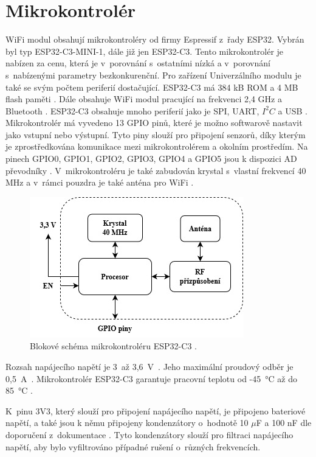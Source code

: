 \section{Mikrokontrolér}
WiFi modul obsahují mikrokontroléry od firmy Espressif z~řady ESP32. Vybrán byl typ ESP32-C3-MINI-1, dále již jen ESP32-C3. Tento mikrokontrolér je nabízen za cenu, která 
je v~porovnání s~ostatními nízká a v~porovnání s~nabízenými parametry bezkonkurenční. Pro zařízení Univerzálního modulu je také se svým počtem periferií dostačující. ESP32-C3 má 
384 kB ROM a 4 MB flash paměti \cite{ESP_C3_dtsh}. Dále obsahuje WiFi modul pracující na frekvenci 2,4 GHz a Bluetooth \cite{ESP_C3_dtsh}. ESP32-C3 obsahuje mnoho periferií
jako je SPI, UART, $I^2C$ a USB \cite{ESP_C3_dtsh}. Mikrokontrolér má vyvedeno 13 GPIO pinů, které je možno softwarově nastavit jako vstupní nebo výstupní. Tyto piny
slouží pro připojení senzorů, díky kterým je zprostředkována komunikace mezi mikrokontrolérem a okolním prostředím. Na pinech GPIO0, GPIO1, GPIO2, GPIO3, GPIO4 a GPIO5 jsou 
k dispozici AD převodníky \cite{ESP_C3_tech_ref}. V~mikrokontroléru je také zabudován krystal s~vlastní frekvencí 
40 MHz a v~rámci pouzdra je také anténa pro WiFi \cite{ESP_C3_dtsh}.

\begin{figure}[!h]
  \begin{center}
    \includegraphics[scale=0.8]{obrazky/blokove_schema_MCU.jpg}
  \end{center}
  \caption[Blokové schéma mikrokontroléru ESP32-C3]{Blokové schéma mikrokontroléru ESP32-C3 \cite{ESP_C3_dtsh}.}
\end{figure}

Rozsah napájecího napětí je 3~až 3,6~V~\cite{ESP_C3_dtsh}. Jeho maximální proudový odběr je 0,5~A~\cite{ESP_C3_dtsh}. Mikrokontrolér ESP32-C3 garantuje pracovní teplotu 
od -45~°C až do 85~°C \cite{ESP_C3_dtsh}.

K~pinu 3V3, který slouží pro připojení napájecího napětí, je připojeno bateriové napětí, a také jsou k němu připojeny kondenzátory o~hodnotě 10 $\mu$F a 100 nF dle doporučení z~dokumentace \cite{ESP_C3_dtsh}. Tyto 
kondenzátory slouží pro filtraci napájecího napětí, aby bylo vyfiltrováno případné rušení o~různých frekvencích.

